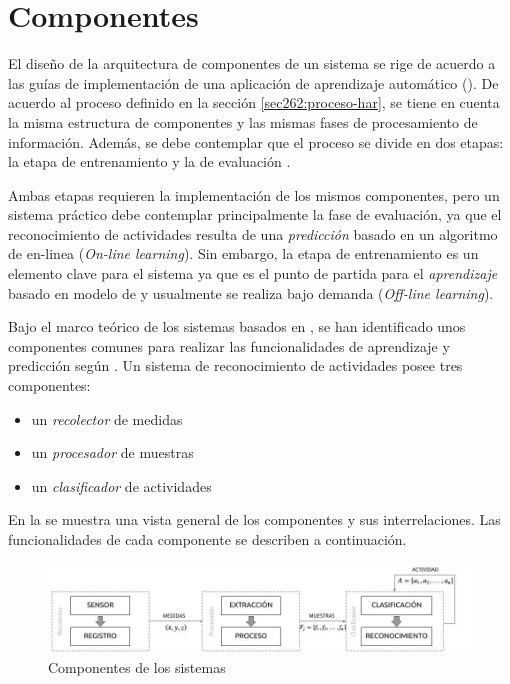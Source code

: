 \section{Componentes}

\label{sec42:componentes}El diseño de la arquitectura de componentes
de un sistema  se rige de acuerdo a las guías de implementación
de una aplicación de aprendizaje automático (). De acuerdo
al proceso definido en la sección \ref{sec262:proceso-har}, se tiene
en cuenta la misma estructura de componentes y las mismas fases de
procesamiento de información. Además, se debe contemplar que el proceso
se divide en dos etapas: la etapa de entrenamiento y la de evaluación
\cite{LaraLabrador2013}. 

Ambas etapas requieren la implementación de los mismos componentes,
pero un sistema  práctico debe contemplar principalmente
la fase de evaluación, ya que el reconocimiento de actividades resulta
de una \emph{predicción} basado en un algoritmo de  en-linea
(\emph{On-line learning}). Sin embargo, la etapa de entrenamiento
es un elemento clave para el sistema ya que es el punto de partida
para el \emph{aprendizaje} basado en modelo de  y usualmente
se realiza bajo demanda (\emph{Off-line learning}).

Bajo el marco teórico de los sistemas  basados en ,
se han identificado unos componentes comunes para realizar las funcionalidades
de aprendizaje y predicción según \cite{Choudhury2008}. Un sistema
de reconocimiento de actividades posee tres componentes:
\begin{itemize}
\item un \emph{recolector }de medidas
\item un\emph{ procesador }de muestras 
\item un \emph{clasificador }de actividades
\end{itemize}
En la  se muestra una vista general
de los componentes y sus interrelaciones. Las funcionalidades de cada
componente se describen a continuación. 

\begin{figure}[!tbph]
\centering{}\includegraphics[width=1\linewidth]{capitulo-4/graphics/diagrama_4_1}\caption[Arquitectura de sistema HAR]{\label{fig4:componentes-har}Componentes de los sistemas }
\end{figure}


